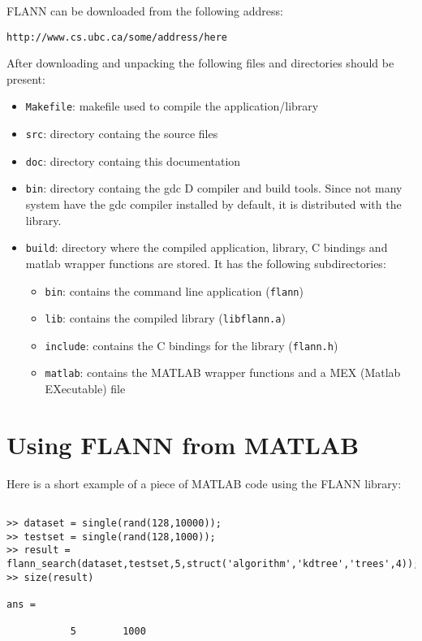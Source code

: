 \documentclass[letter,10pt]{article}
\begin{document}
FLANN can be downloaded from the following address:
\begin{center}
\texttt{http://www.cs.ubc.ca/some/address/here}
\end{center}

After downloading and unpacking the following files and directories should be present:
\begin{itemize}
\item \texttt{Makefile}: makefile used to compile the application/library
\item \texttt{src}: directory containg the source files
\item \texttt{doc}: directory containg this documentation
\item \texttt{bin}: directory containg the gdc D compiler and build tools. Since not many system have the gdc compiler installed by default, it is distributed with the library.
\item \texttt{build}: directory where the compiled application, library, C bindings and matlab wrapper functions are stored. It has the following subdirectories:
\begin{itemize}
\item \texttt{bin}: contains the command line application (\texttt{flann})
\item \texttt{lib}: contains the compiled library (\texttt{libflann.a})
\item \texttt{include}: contains the C bindings for the library (\texttt{flann.h})
\item \texttt{matlab}: contains the MATLAB wrapper functions and a MEX (Matlab EXecutable) file
\end{itemize}



\end{itemize}

\section{Using FLANN from MATLAB}

Here is a short example of a piece of MATLAB code using the FLANN library:
\begin{Verbatim}[fontsize=\footnotesize,frame=single]

>> dataset = single(rand(128,10000));
>> testset = single(rand(128,1000));
>> result = flann_search(dataset,testset,5,struct('algorithm','kdtree','trees',4));
>> size(result)

ans =

           5        1000
\end{Verbatim}
\end{document}
